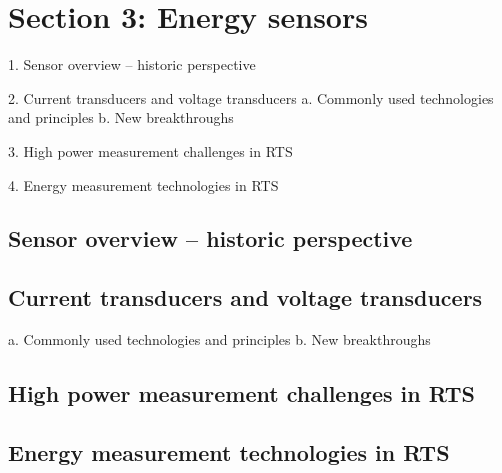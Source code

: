 


\section{Section 3: Energy sensors}

1.	Sensor overview – historic perspective

2.	Current transducers and voltage transducers
a.	Commonly used technologies and principles
b.	New breakthroughs

3.	High power measurement challenges in RTS

4.	Energy measurement technologies in RTS 


\subsection{Sensor overview – historic perspective}

\subsection{Current transducers and voltage transducers}
	
a.	Commonly used technologies and principles
b.	New breakthroughs

\subsection{High power measurement challenges in RTS}	

\subsection{Energy measurement technologies in RTS }